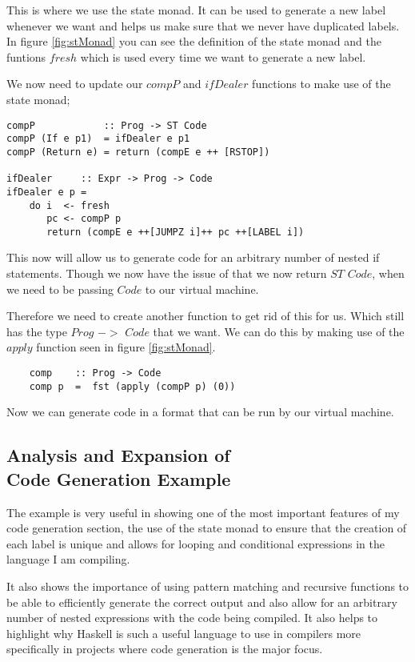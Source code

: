 This is where we use the state monad. It can be used to generate a new label whenever we want and helps us make sure that we never have duplicated labels. In figure \ref{fig:stMonad} you can see the definition of the state monad and the funtions $fresh$ which is used every time we want to generate a new label. 

We now need to update our $compP$ and $ifDealer$ functions to make use of the state monad;

\begin{lstlisting}
compP            :: Prog -> ST Code 
compP (If e p1)  = ifDealer e p1  
compP (Return e) = return (compE e ++ [RSTOP])
	
ifDealer     :: Expr -> Prog -> Code 
ifDealer e p = 
	do i  <- fresh
	   pc <- compP p
	   return (compE e ++[JUMPZ i]++ pc ++[LABEL i])
\end{lstlisting}

This now will allow us to generate code for an arbitrary number of nested if statements. Though we now have the issue of that we now return $ST$ $Code$, when we need to be passing $Code$ to our virtual machine. 

Therefore we need to create another function to get rid of this for us. Which still has the type $Prog$ $->$ $Code$ that we want. We can do this by making use of the $apply$ function seen in figure \ref{fig:stMonad}.

\begin{lstlisting}
	comp    :: Prog -> Code
	comp p  =  fst (apply (compP p) (0))
\end{lstlisting}    

Now we can generate code in a format that can be run by our virtual machine.

\subsection[Analysis and Expansion of Code Generation Example]{Analysis and Expansion of \\ Code Generation Example}

The example is very useful in showing one of the most important features of my code generation section, the use of the state monad to ensure that the creation of each label is unique and allows for looping and conditional expressions in the language I am compiling.

It also shows the importance of using pattern matching and recursive functions to be able to efficiently generate the correct output and also allow for an arbitrary number of nested expressions with the code being compiled. It also helps to highlight why Haskell is such a useful language to use in compilers more specifically in projects where code generation is the major focus.

